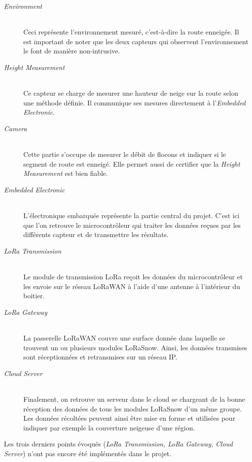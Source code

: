 \begin{description}
    \item[\emph{Environment}] \hfill \\ 
    Ceci représente l'environnement mesuré, c'est-à-dire la route enneigée. Il est important de noter
    que les deux capteurs qui observent l'environnement le font de manière non-intrusive.
    \item[\emph{Height Measurement}] \hfill \\
    Ce capteur se charge de mesurer une hauteur de neige sur la route selon une méthode définie. Il 
    communique ses mesures directement à l'\emph{Embedded Electronic}. 
    \item[\emph{Camera}] \hfill \\
    Cette partie s'occupe de mesurer le débit de flocons et indiquer si le segment de route est enneigé.
    Elle permet aussi de certifier que la \emph{Height Measurement} est bien fiable.
    \item[\emph{Embedded Electronic}] \hfill \\
    L'électronique embarquée représente la partie central du projet. C'est ici que l'on retrouve le
    microcontrôleur qui traiter les données reçues par les différents capteur et de transmettre les
    résultats. 
    \item[\emph{LoRa Transmission}] \hfill \\
     Le module de transmission LoRa reçoit les données du microcontrôleur et les envoie sur le réseau 
     LoRaWAN à l'aide d'une antenne à l'intérieur du boitier.
    \item[\emph{LoRa Gateway}] \hfill \\
    La passerelle LoRaWAN couvre une surface donnée dans laquelle se trouvent un ou plusieurs modules 
    LoRaSnow. Ainsi, les données transmises sont réceptionnées et retransmises sur un réseau IP. 
    \item[\emph{Cloud Server}] \hfill \\   
    Finalement, on retrouve un serveur dans le cloud se chargeant de la bonne réception des données 
    de tous les modules LoRaSnow d'un même groupe. Les données récoltées peuvent ainsi être mise en
    forme et utilisées pour indiquer par exemple la couverture neigeuse d'une région.
\end{description}

Les trois derniers points évoqués (\emph{LoRa Transmission, LoRa Gateway, Cloud Server}) 
n'ont pas encore été implémentés dans le projet.